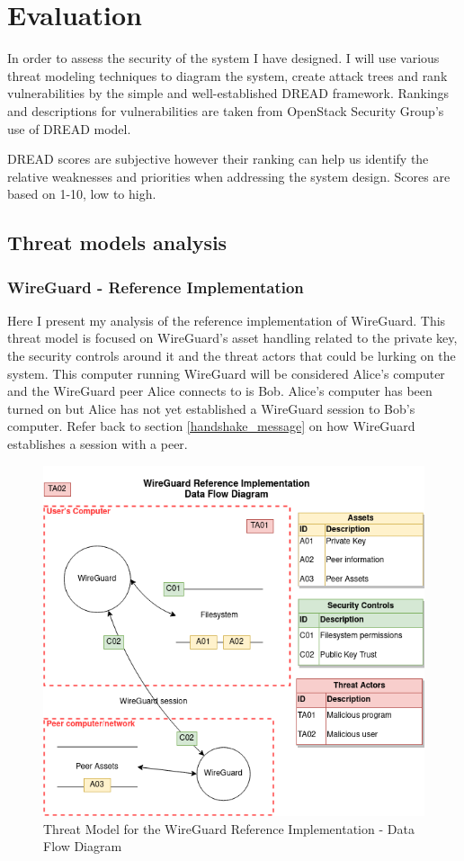 \documentclass [11pt, proquest] {uwthesis}[2020/02/24]
\begin{document}
\chapter {Evaluation}
In order to assess the security of the system I have designed. I will use various threat modeling techniques to diagram the system, create attack trees and rank vulnerabilities by the simple and well-established DREAD framework. Rankings and descriptions for vulnerabilities are taken from OpenStack Security Group's use of DREAD model\cite{noauthor_securityossa-metrics_2022}.

DREAD scores are subjective however their ranking can help us identify the relative weaknesses and priorities when addressing the system design. Scores are based on 1-10, low to high.
\section{Threat models analysis}

\subsection {WireGuard - Reference Implementation}
\label{wg-ref-analysis}
Here I present my analysis of the reference implementation of WireGuard. This threat model is focused on WireGuard's asset handling related to the private key, the security controls around it and the threat actors that could be lurking on the system. This computer running WireGuard will be considered Alice's computer and the WireGuard peer Alice connects to is Bob. Alice's computer has been turned on but Alice has not yet established a WireGuard session to Bob's computer. Refer back to section \ref{handshake_message} on how WireGuard establishes a session with a peer. 

\begin{figure}[ht]
\includegraphics[width=14cm]{paper/images/WGH_DFD.drawio.png}
\caption{Threat Model for the WireGuard Reference Implementation - Data Flow Diagram}
\label{fig:wg_ref_dfd}
\end{figure}
\end{document}

